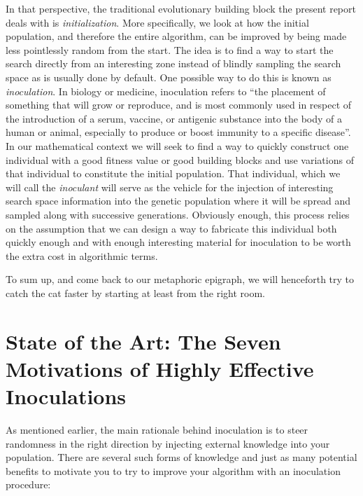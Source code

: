 \documentclass[english]{DESCARWINreport}
\begin{document}
In that perspective, the traditional evolutionary building block the present report deals with is \emph{initialization}. More specifically, we look at how the initial population, and therefore the entire algorithm, can be improved by being made less pointlessly random from the start. The idea is to find a way to start the search directly from an interesting zone instead of blindly sampling the search space as is usually done by default. One possible way to do this is known as \emph{inoculation}. In biology or medicine, inoculation refers to ``the placement of something that will grow or reproduce, and is most commonly used in respect of the introduction of a serum, vaccine, or antigenic substance into the body of a human or animal, especially to produce or boost immunity to a specific disease''. In our mathematical context we will seek to find a way to quickly construct one individual with a good fitness value or good building blocks and use variations of that individual to constitute the initial population. That individual, which we will call the \emph{inoculant} will serve as the vehicle for the injection of interesting search space information into the genetic population where it will be spread and sampled along with successive generations.  Obviously enough, this process relies on the assumption that we can design a way to fabricate this individual both quickly enough and with enough interesting material for inoculation to be worth the extra cost in algorithmic terms.

To sum up, and come back to our metaphoric epigraph, we will henceforth try to catch the cat faster by starting at least from the right room.

\section{State of the Art: The Seven Motivations of Highly Effective Inoculations}


As mentioned earlier, the main rationale behind inoculation is to steer randomness in the right direction by injecting external knowledge into your population. There are several such forms of knowledge and just as many potential benefits to motivate you to try to improve your algorithm with an inoculation procedure:
\end{document}
